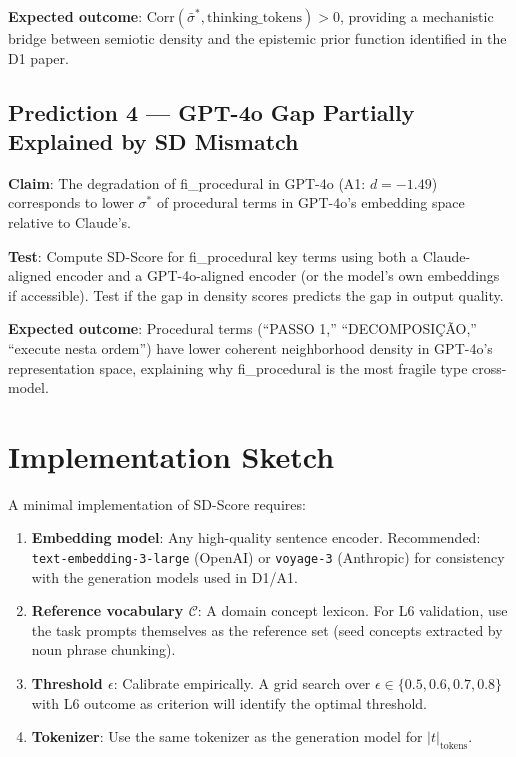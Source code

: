 \documentclass[11pt,a4paper]{article}
\begin{document}
\textbf{Expected outcome}: $\text{Corr}(\bar{\sigma}^*, \text{thinking\_tokens}) > 0$,
providing a mechanistic bridge between semiotic density and the epistemic prior
function identified in the D1 paper.

\subsection{Prediction 4 — GPT-4o Gap Partially Explained by SD Mismatch}

\textbf{Claim}: The degradation of fi\_procedural in GPT-4o (A1: $d = -1.49$)
corresponds to lower $\sigma^*$ of procedural terms in GPT-4o's embedding space
relative to Claude's.

\textbf{Test}: Compute SD-Score for fi\_procedural key terms using both
a Claude-aligned encoder and a GPT-4o-aligned encoder
(or the model's own embeddings if accessible). Test if the gap in density scores
predicts the gap in output quality.

\textbf{Expected outcome}: Procedural terms
(``PASSO 1,'' ``DECOMPOSIÇÃO,'' ``execute nesta ordem'') have lower coherent
neighborhood density in GPT-4o's representation space, explaining why
fi\_procedural is the most fragile type cross-model.

\section{Implementation Sketch}
\label{sec:implementation}

A minimal implementation of SD-Score requires:

\begin{enumerate}
  \item \textbf{Embedding model}: Any high-quality sentence encoder.
    Recommended: \texttt{text-embedding-3-large} (OpenAI) or
    \texttt{voyage-3} (Anthropic) for consistency with the generation models
    used in D1/A1.

  \item \textbf{Reference vocabulary $\mathcal{C}$}: A domain concept lexicon.
    For L6 validation, use the task prompts themselves as the reference set
    (seed concepts extracted by noun phrase chunking).

  \item \textbf{Threshold $\epsilon$}: Calibrate empirically.
    A grid search over $\epsilon \in \{0.5, 0.6, 0.7, 0.8\}$ with L6 outcome
    as criterion will identify the optimal threshold.

  \item \textbf{Tokenizer}: Use the same tokenizer as the generation model for
    $|t|_\text{tokens}$.
\end{enumerate}
\end{document}

